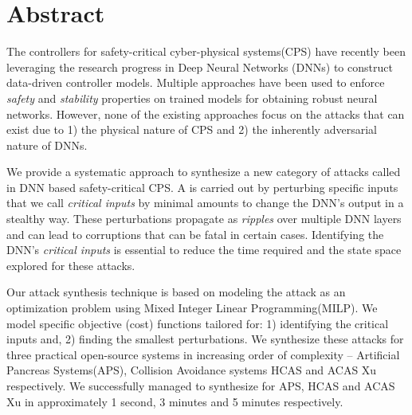 
\chapter{Abstract}

The controllers for safety-critical cyber-physical systems(CPS) have recently been leveraging the research progress in Deep Neural Networks (DNNs) to construct data-driven controller models. Multiple approaches have been used to enforce \textit{safety} and \textit{stability} properties on trained models for obtaining robust neural networks. However, none of the existing approaches focus on the attacks that can exist due to 1) the physical nature of CPS and 2) the inherently adversarial nature of DNNs.  

We provide a systematic approach to synthesize a new category of attacks called \attack in DNN based safety-critical CPS. A \attack is carried out by perturbing specific inputs that we call \textit{critical inputs} by minimal amounts to change the DNN's output in a stealthy way. These perturbations propagate as \textit{ripples} over multiple DNN layers and can lead to corruptions that can be fatal in certain cases. Identifying the DNN's \textit{critical inputs} is essential to reduce the time required and the state space explored for these attacks. %

Our attack synthesis technique is based on modeling the attack as an optimization problem using Mixed Integer Linear Programming(MILP). We model \attack specific objective (cost) functions tailored for: 1) identifying the critical inputs and, 2) finding the smallest perturbations. We synthesize these attacks for three practical open-source systems in increasing order of complexity -- Artificial Pancreas Systems(APS), Collision Avoidance systems HCAS and ACAS Xu respectively. We successfully managed to synthesize  \attack for APS, HCAS and ACAS Xu in approximately 1 second, 3 minutes and 5 minutes respectively. 

